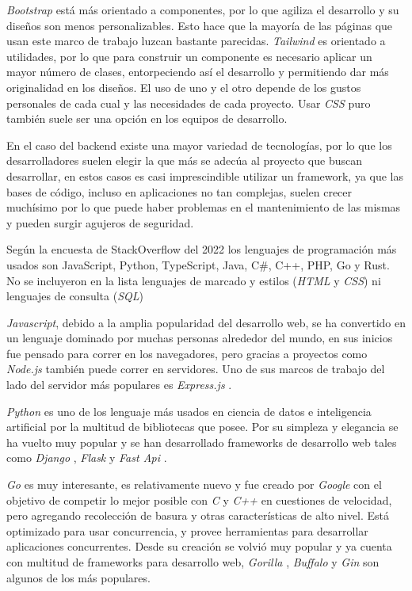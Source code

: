 \textit{Bootstrap} está más orientado a componentes, por lo que agiliza el desarrollo y su diseños son menos personalizables. Esto hace que la mayoría de las páginas que usan este marco de trabajo luzcan bastante parecidas. \textit{Tailwind} es orientado a utilidades, por lo que para construir un componente es necesario aplicar un mayor número de clases, entorpeciendo así el desarrollo y permitiendo dar más originalidad en los diseños. El uso de uno y el otro depende de los gustos personales de cada cual y las necesidades de cada proyecto. Usar \textit{CSS} puro también suele ser una opción en los equipos de desarrollo.
\newline

En el caso del backend existe una mayor variedad de tecnologías, por lo que los desarrolladores suelen elegir la que más se adecúa al proyecto que buscan desarrollar, en estos casos es casi imprescindible utilizar un framework, ya que las bases de código, incluso en aplicaciones no tan complejas, suelen crecer muchísimo por lo que puede haber problemas en el mantenimiento de las mismas y pueden surgir agujeros de seguridad.
\newline

Según la encuesta de StackOverflow del 2022 \cite{encuesta2022} los lenguajes de programación más usados son
	 JavaScript,
	 Python,
	 TypeScript,
	 Java,
	 C\#,
	 C++,
	 PHP,
	 Go y
	 Rust.
No se incluyeron en la lista lenguajes de marcado y estilos (\textit{HTML} y \textit{CSS}) ni lenguajes de consulta (\textit{SQL})
\newline

\textit{Javascript}, debido a la amplia popularidad del desarrollo web, se ha convertido en un lenguaje dominado por muchas personas alrededor del mundo, en sus inicios fue pensado para correr en los navegadores, pero gracias a proyectos como \textit{Node.js} \cite{node} también puede correr en servidores. Uno de sus marcos de trabajo del lado del servidor más populares  es \textit{Express.js} \cite{express}.
\newline

\textit{Python} es uno de los lenguaje más usados en ciencia de datos e inteligencia artificial por la multitud de bibliotecas que posee. Por su simpleza y elegancia se ha vuelto muy popular y se han desarrollado frameworks de desarrollo web tales como \textit{Django} \cite{django}, \textit{Flask} \cite{flask} y \textit{Fast Api} \cite{fastapi}.
\newline

\textit{Go} \cite{golang} es muy interesante, es relativamente nuevo y fue creado por \textit{Google} con el objetivo de competir lo mejor posible con \textit{C} y \textit{C++} en cuestiones de velocidad, pero agregando recolección de basura y otras características de alto nivel. Está optimizado para usar concurrencia, y provee herramientas para desarrollar aplicaciones concurrentes. Desde su creación se volvió muy popular y ya cuenta con multitud de frameworks para desarrollo web, \textit{Gorilla} \cite{gorilla}, \textit{Buffalo} \cite{buffalo} y \textit{Gin} \cite{gin} son algunos de los más populares.
\newline

